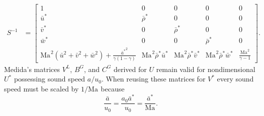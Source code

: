 \documentclass[letterpaper,11pt,nointlimits,reqno,draft]{amsart}
\newcommand{\Mach}[1][]{\ensuremath{\mbox{Ma}_{#1}}}
\begin{document}
\begin{align}
S^{-1} &= \left[\begin{array}{ccccc}
  1                                                                                          & 0                              & 0                              & 0                              & 0                        \\
  \bar{u}^{*}                                                                                & \bar{\rho}^*                   & 0                              & 0                              & 0                        \\
  \bar{v}^{*}                                                                                & 0                              & \bar{\rho}^*                   & 0                              & 0                        \\
  \bar{w}^{*}                                                                                & 0                              & 0                              & \bar{\rho}^*                   & 0                        \\
  \Mach^2\left(\bar{u}^2+\bar{v}^2+\bar{w}^2\right)+\frac{{\bar{a}^{*}}^2}{\gamma(1-\gamma)} & \Mach^2 \bar{\rho}^* \bar{u}^* & \Mach^2 \bar{\rho}^* \bar{v}^* & \Mach^2 \bar{\rho}^* \bar{w}^* & \frac{\Mach^2}{\gamma-1}
\end{array}\right]
.
\end{align}
Medida's matrices $V^L$, $B^G$, and $C^G$ derived for $U$ remain valid for
nondimensional $U^*$ possessing sound speed $a/u_0$.  When reusing these
matrices for $V^*$ every sound speed must be scaled by $1/\Mach$ because
\[
  \frac{\bar{a}}{u_0} = \frac{a_0 \bar{a}^*}{u_0} = \frac{\bar{a}^*}{\Mach}.
\]
\end{document}
